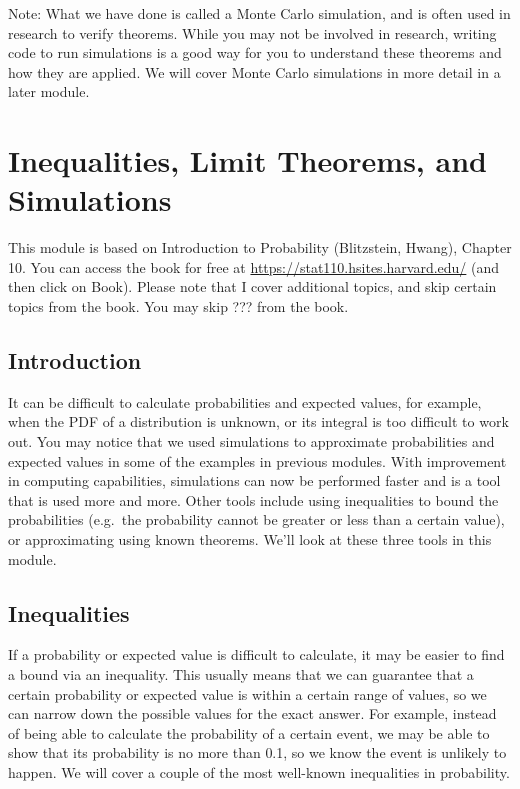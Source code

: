 \documentclass[
]{book}
\begin{document}
Note: What we have done is called a Monte Carlo simulation, and is often used in research to verify theorems. While you may not be involved in research, writing code to run simulations is a good way for you to understand these theorems and how they are applied. We will cover Monte Carlo simulations in more detail in a later module.

\chapter{Inequalities, Limit Theorems, and Simulations}\label{inequalities-limit-theorems-and-simulations}

This module is based on Introduction to Probability (Blitzstein, Hwang), Chapter 10. You can access the book for free at \url{https://stat110.hsites.harvard.edu/} (and then click on Book). Please note that I cover additional topics, and skip certain topics from the book. You may skip ??? from the book.

\section{Introduction}\label{introduction-2}

It can be difficult to calculate probabilities and expected values, for example, when the PDF of a distribution is unknown, or its integral is too difficult to work out. You may notice that we used simulations to approximate probabilities and expected values in some of the examples in previous modules. With improvement in computing capabilities, simulations can now be performed faster and is a tool that is used more and more. Other tools include using inequalities to bound the probabilities (e.g.~the probability cannot be greater or less than a certain value), or approximating using known theorems. We'll look at these three tools in this module.

\section{Inequalities}\label{inequalities}

If a probability or expected value is difficult to calculate, it may be easier to find a bound via an inequality. This usually means that we can guarantee that a certain probability or expected value is within a certain range of values, so we can narrow down the possible values for the exact answer. For example, instead of being able to calculate the probability of a certain event, we may be able to show that its probability is no more than 0.1, so we know the event is unlikely to happen. We will cover a couple of the most well-known inequalities in probability.
\end{document}
